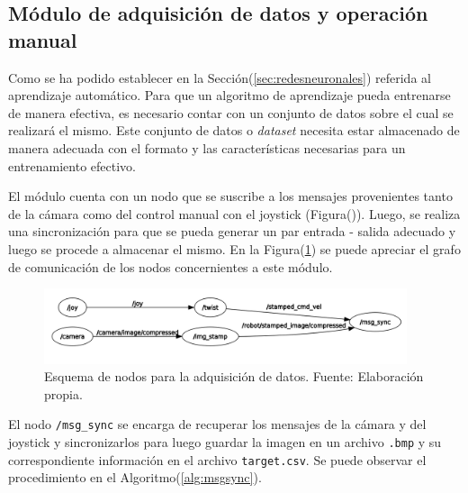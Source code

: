     \subsection{Módulo de adquisición de datos y operación manual}
    Como se ha podido establecer en la Sección(\ref{sec:redesneuronales}) referida al aprendizaje automático. Para que un algoritmo de aprendizaje pueda 
    entrenarse de manera efectiva, es necesario contar con un conjunto de datos sobre el cual se realizará el mismo. Este conjunto 
    de datos o \textit{dataset} necesita estar almacenado de manera adecuada con el formato y las características necesarias para 
    un entrenamiento efectivo.
    

    El módulo cuenta con un nodo que se suscribe a los mensajes provenientes tanto de la cámara como del control manual con el 
    joystick (Figura()). Luego, se realiza una sincronización para que se pueda generar un par entrada - salida 
    adecuado y luego se procede a almacenar el mismo. En la Figura(\ref{fig:nodosdaq}) se puede apreciar el grafo de comunicación de los 
    nodos concernientes a este módulo.


    
    \begin{figure}[!h] 
        \centering
        \includegraphics[width=0.95\textwidth]{img/nodosdaq}
        \caption[Esquema de nodos para la adquisición de datos]{Esquema de nodos para la adquisición de datos. Fuente: Elaboración propia. }
        \label{fig:nodosdaq}
    \end{figure}

    El nodo \lstinline{/msg_sync} se encarga de recuperar los mensajes de la cámara y del joystick y sincronizarlos para luego 
    guardar la imagen en un archivo \lstinline{.bmp} y su correspondiente información en el archivo \lstinline{target.csv}. 
    Se puede observar el procedimiento en el Algoritmo(\ref{alg:msgsync}).

